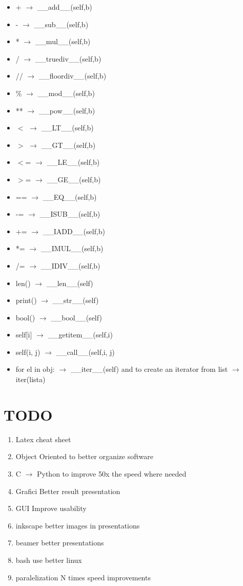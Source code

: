 \documentclass{article}
\begin{document}
\begin{multicols}{2}
\begin{itemize}
\item + $\rightarrow$ \_\_add\_\_(self,b)
\item - $\rightarrow$ \_\_sub\_\_(self,b)
\item * $\rightarrow$ \_\_mul\_\_(self,b)
\item / $\rightarrow$ \_\_truediv\_\_(self,b)
\item // $\rightarrow$ \_\_floordiv\_\_(self,b)
\item \% $\rightarrow$ \_\_mod\_\_(self,b)
\item ** $\rightarrow$ \_\_pow\_\_(self,b)
\item $<$ $\rightarrow$ \_\_LT\_\_(self,b)
\item $>$ $\rightarrow$ \_\_GT\_\_(self,b)
\item $<$= $\rightarrow$ \_\_LE\_\_(self,b)
\item $>$= $\rightarrow$ \_\_GE\_\_(self,b)
\columnbreak
\item == $\rightarrow$ \_\_EQ\_\_(self,b)
\item -= $\rightarrow$ \_\_ISUB\_\_(self,b)
\item += $\rightarrow$ \_\_IADD\_\_(self,b)
\item *= $\rightarrow$ \_\_IMUL\_\_(self,b)
\item /= $\rightarrow$ \_\_IDIV\_\_(self,b)\\
\item len() $\rightarrow$ \_\_len\_\_(self)
\item print() $\rightarrow$ \_\_str\_\_(self)
\item bool() $\rightarrow$ \_\_bool\_\_(self)
\item self[i] $\rightarrow$ \_\_getitem\_\_(self,i)
\item self(i, j) $\rightarrow$ \_\_call\_\_(self,i, j)
\item for el in obj: $\rightarrow$ \_\_iter\_\_(self) and to create an iterator from list $\rightarrow$ iter(lista)

\end{itemize}
\section{TODO}
\begin{enumerate}
\item Latex cheat sheet
\item Object Oriented to better organize software
\item C $\rightarrow$ Python to improve 50x the speed where needed
\item Grafici Better result presentation
\item GUI Improve usability
\item inkscape better images in presentations
\item beamer better presentations
\item bash use better linux
\item paralelization N times speed improvements
\end{enumerate}
\end{multicols}
\end{document}
